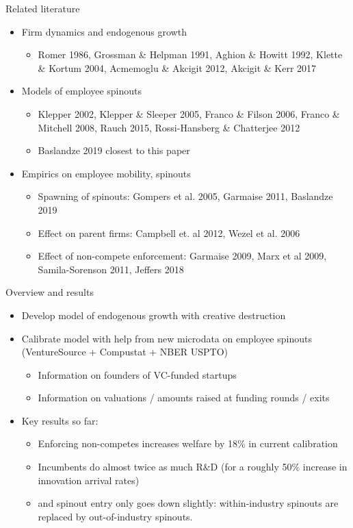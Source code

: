 \documentclass[english,usenames,dvipsnames]{beamer}
\begin{document}
\begin{frame}{Related literature}
\begin{itemize}
	\item Firm dynamics and endogenous growth
	\begin{itemize}
		\item Romer 1986, Grossman \& Helpman 1991, Aghion \& Howitt 1992, Klette \& Kortum 2004, Acmemoglu \& Akcigit 2012, Akcigit \& Kerr 2017
	\end{itemize}
	\item Models of employee spinouts
	\begin{itemize}
		\item Klepper 2002, Klepper \& Sleeper 2005, Franco \& Filson 2006, Franco \& Mitchell 2008, Rauch 2015, Rossi-Hansberg \& Chatterjee 2012
		\item Baslandze 2019 closest to this paper
	\end{itemize}
	\item Empirics on employee mobility, spinouts
	\begin{itemize}
		\item Spawning of spinouts: Gompers et al. 2005, Garmaise 2011, Baslandze 2019
		\item Effect on parent firms: Campbell et. al 2012, Wezel et al. 2006
		\item Effect of non-compete enforcement: Garmaise 2009, Marx et al 2009, Samila-Sorenson 2011, Jeffers 2018
	\end{itemize}
\end{itemize}
\end{frame}

\begin{frame}{Overview and results}
\begin{itemize}
	\item Develop model of endogenous growth with creative destruction
	\item Calibrate model with help from new microdata on employee spinouts (VentureSource + Compustat + NBER USPTO)
	\begin{itemize}
		\item Information on founders of VC-funded startups
		\item Information on valuations / amounts raised at funding rounds / exits
	\end{itemize}
	\item Key results so far:
	\begin{itemize}
		\item Enforcing non-competes increases welfare by 18\% in current calibration
		\item Incumbents do almost twice as much R\&D (for a roughly 50\% increase in innovation arrival rates)
		\item and spinout entry only goes down slightly: within-industry spinouts are replaced by out-of-industry spinouts.
	\end{itemize}
\end{itemize}
\end{frame}
\end{document}
